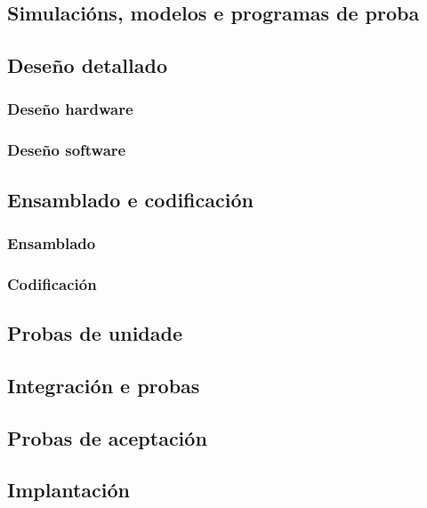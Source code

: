  \subsection{Simulacións, modelos e programas de proba}

 \subsection{Deseño detallado}

  \subsubsection{Deseño hardware}

  \subsubsection{Deseño software}

 \subsection{Ensamblado e codificación}

  \subsubsection{Ensamblado}

  \subsubsection{Codificación}

 \subsection{Probas de unidade}

 \subsection{Integración e probas}

 \subsection{Probas de aceptación}

 \subsection{Implantación}
